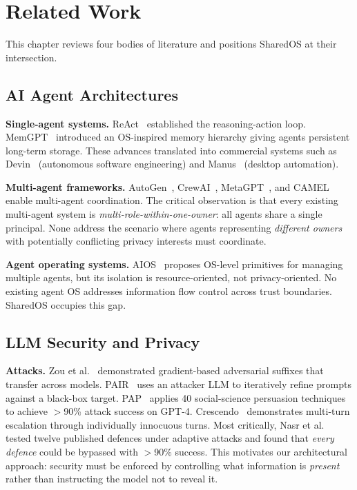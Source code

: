 \chapter{Related Work}
\label{chapter:related_work}

This chapter reviews four bodies of literature and positions SharedOS at their intersection.


\section{AI Agent Architectures}
\label{sec:rw_agents}

\textbf{Single-agent systems.} ReAct~\cite{yao2023react} established the reasoning-action loop. MemGPT~\cite{packer2024memgpt} introduced an OS-inspired memory hierarchy giving agents persistent long-term storage. These advances translated into commercial systems such as Devin~\cite{devin2024} (autonomous software engineering) and Manus~\cite{manus2025} (desktop automation).

\textbf{Multi-agent frameworks.} AutoGen~\cite{wu2023autogen}, CrewAI~\cite{crewai2024}, MetaGPT~\cite{hong2023metagpt}, and CAMEL~\cite{li2023camel} enable multi-agent coordination. The critical observation is that every existing multi-agent system is \textit{multi-role-within-one-owner}: all agents share a single principal. None address the scenario where agents representing \textit{different owners} with potentially conflicting privacy interests must coordinate.

\textbf{Agent operating systems.} AIOS~\cite{mei2025aios} proposes OS-level primitives for managing multiple agents, but its isolation is resource-oriented, not privacy-oriented. No existing agent OS addresses information flow control across trust boundaries. SharedOS occupies this gap.


\section{LLM Security and Privacy}
\label{sec:rw_security}

\textbf{Attacks.} Zou et al.~\cite{zou2023universal} demonstrated gradient-based adversarial suffixes that transfer across models. PAIR~\cite{chao2025pair} uses an attacker LLM to iteratively refine prompts against a black-box target. PAP~\cite{zeng2024pap} applies 40 social-science persuasion techniques to achieve $>$90\% attack success on GPT-4. Crescendo~\cite{russinovich2025crescendo} demonstrates multi-turn escalation through individually innocuous turns. Most critically, Nasr et al.~\cite{nasr2025attacker} tested twelve published defences under adaptive attacks and found that \textit{every defence} could be bypassed with $>$90\% success. This motivates our architectural approach: security must be enforced by controlling what information is \textit{present} rather than instructing the model not to reveal it.

